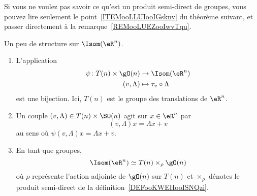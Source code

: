 Si vous ne voulez pas savoir ce qu'est un produit semi-direct de groupes, vous pouvez lire seulement le point~\ref{ITEMooLLUIooIGsknv} du théorème suivant, et passer directement à la remarque~\ref{REMooLUEZooIwvTqu}.
\begin{theorem}     \label{THOooQJSRooMrqQct}
    Un peu de structure sur \( \Isom(\eR^n)\).
    \begin{enumerate}
        \item       \label{ITEMooLLUIooIGsknv}
            L'application
            \begin{equation}
                \begin{aligned}
                    \psi\colon T(n)\times \gO(n)&\to \Isom(\eR^n) \\
                    (v,\Lambda)&\mapsto \tau_v\circ\Lambda
                \end{aligned}
            \end{equation}
            est une bijection. Ici,  \( T(n)\) est le groupe des translations de \( \eR^n\).
        \item
            Un couple \( (v,\Lambda)\in T(n)\times\SO(n)\) agit sur \( x\in \eR^n\) par
            \begin{equation}
                (v,\Lambda)x=\Lambda x+v
            \end{equation}
            au sens où \( \psi(v,\Lambda)x=\Lambda x+v\).
        \item       \label{ITEMooEWSIooNKzRxB}
            En tant que groupes,
            \begin{equation}
                \Isom(\eR^n)\simeq T(n)\times_{\rho}\gO(n)
            \end{equation}
            où \( \rho\) représente l'action adjointe de \( \gO(n)\) sur \( T(n)\) et \( \times_{\rho}\) dénotes le produit semi-direct de la définition~\ref{DEFooKWEHooISNQzi}.
    \end{enumerate}
\end{theorem}

